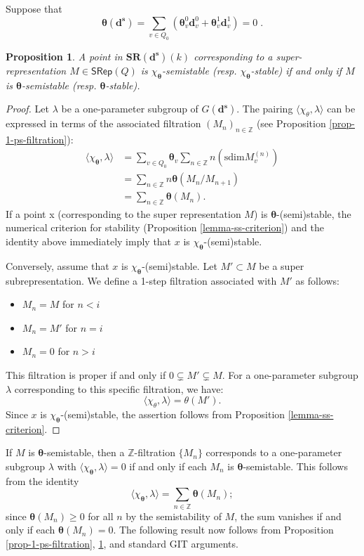 \documentclass[12pt, reqno]{amsart}
\theoremstyle{plain}
\newtheorem{proposition}[theorem]{Proposition}
\numberwithin{equation}{section}
\def \d{\mathbf{d}}
\def \sd{\mathbf{d^s}}
\def \bfSR{\mathbf{SR}}
\def \btheta{\boldsymbol{\theta}}
\newcommand{\sdim}{\mathrm{sdim}}
\begin{document}
Suppose that 
$$
\btheta(\sd) = \sum_{v\in Q_0} (\btheta_v^0 \d_v^0 + \btheta_v^1 \d_v^1) = 0\;.
$$

\begin{proposition}\cite[cf. Proposition 3.1]{Ki94}\label{prop-king3.1}
A point in $\bfSR(\sd)(k)$ corresponding to a super-representation $M \in \mathsf{SRep}(Q)$ is $\chi_{\btheta}$-semistable (resp. $\chi_{\btheta}$-stable) if and only if $M$ is $\btheta$-semistable (resp. $\btheta$-stable).
\end{proposition}
\begin{proof}
Let $\lambda$ be a one-parameter subgroup of $G(\sd)$.
The pairing $\langle \chi_{\theta}, \lambda \rangle$ can be  expressed in terms of the associated filtration $(M_{n})_{n \in \mathbb{Z}}$ (see Proposition \ref{prop-1-ps-filtration}):
\begin{align*}
\langle \chi_{\btheta}, \lambda \rangle &= \sum_{v \in Q_{0}} \btheta_{v} \sum_{n \in \mathbb{Z}} n (\sdim M_{v}^{(n)}) \\
&= \sum_{n \in \mathbb{Z}} n \btheta(M_{n}/M_{n+1}) \\
&= \sum_{n \in \mathbb{Z}} \btheta(M_{n}).
\end{align*}
If a point x (corresponding to the super representation $M$) 
is $\btheta$-(semi)stable, the numerical criterion for stability (Proposition \ref{lemma-ss-criterion}) and the identity above immediately imply that $x$ is $\chi_{\btheta}$-(semi)stable.

Conversely, assume that $x$ is $\chi_{\btheta}$-(semi)stable. Let $M' \subset M$ be a super subrepresentation. We define a 1-step filtration associated with $M'$ as follows:
\begin{itemize}
    \item $M_n = M$ for $n < i$
    \item $M_n = M'$ for $n = i$
    \item $M_n = 0$ for $n > i$
\end{itemize}
This filtration is proper if and only if $0 \subsetneq M' \subsetneq M$. For a one-parameter subgroup $\lambda$ corresponding to this specific filtration, we have:
\[
\langle \chi_{\theta}, \lambda \rangle = \theta(M').
\]
Since $x$ is $\chi_{\btheta}$-(semi)stable, the assertion follows from Proposition \ref{lemma-ss-criterion}.
\end{proof}

If $M$ is $\btheta$-semistable, then a $\mathbb{Z}$-filtration $\{M_n\}$ corresponds to a one-parameter subgroup $\lambda$ with $\langle \chi_{\btheta}, \lambda \rangle = 0$ if and only if each $M_n$ is $\btheta$-semistable. This follows from the identity 
$$
\langle \chi_{\btheta}, \lambda \rangle = \sum_{n \in \mathbb{Z}} \btheta(M_n);
$$
since $\btheta(M_n) \geq 0$ for all $n$ by the semistability of $M$, the sum vanishes if and only if each $\btheta(M_n) = 0$.
The following result now follows from Proposition \ref{prop-1-ps-filtration}, \ref{prop-king3.1}, and standard GIT arguments.
\end{document}
